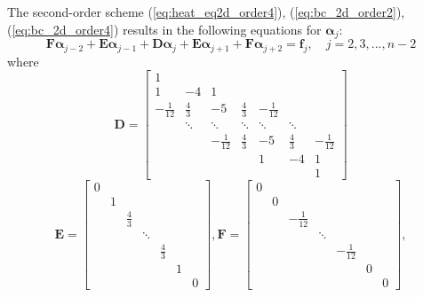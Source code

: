 \documentclass{article}
\begin{document}
The second-order scheme (\ref{eq:heat_eq2d_order4}), (\ref{eq:bc_2d_order2}), (\ref{eq:bc_2d_order4}) results
in the following equations for $\bm\alpha_j$:
\begin{equation*}
    \bm F \bm\alpha_{j-2} + \bm E \bm\alpha_{j-1} + \bm D \bm\alpha_j + \bm E \bm\alpha_{j+1} 
    + \bm F \bm\alpha_{j+2} = \bm f_j,
    \quad j = 2, 3, ..., n-2
\end{equation*}
where
\begin{equation*}
    \bm D =     \begin{bmatrix}
    1 \\
    1  & -4  & 1 \\
    -\frac{1}{12} & \frac{4}{3} & -5 & \frac{4}{3} & -\frac{1}{12} \\
          & \ddots & \ddots & \ddots & \ddots & \ddots \\ 
          &        & -\frac{1}{12} & \frac{4}{3} & -5 & \frac{4}{3} & -\frac{1}{12} \\
          &        &               &             &   1          &     -4      &     1  \\
          &        &               &             &              &             &     1
    \end{bmatrix}
\end{equation*}
\begin{equation*}
    \bm E = 
    \begin{bmatrix}
    0 \\
      &  1 \\
      &   & \frac{4}{3} \\
      &   &            & \ddots \\
      &   &            &       & \frac{4}{3} \\
      &   &            &       &            & 1 \\
      &   &            &       &            &  & 0
    \end{bmatrix},
    \bm F =
    \begin{bmatrix}
    0 \\
      &  0 \\
      &   & -\frac{1}{12} \\
      &   &            & \ddots \\
      &   &            &       & -\frac{1}{12} \\
      &   &            &       &            & 0 \\
      &   &            &       &            &  & 0
    \end{bmatrix},    
\end{equation*}
\end{document}
